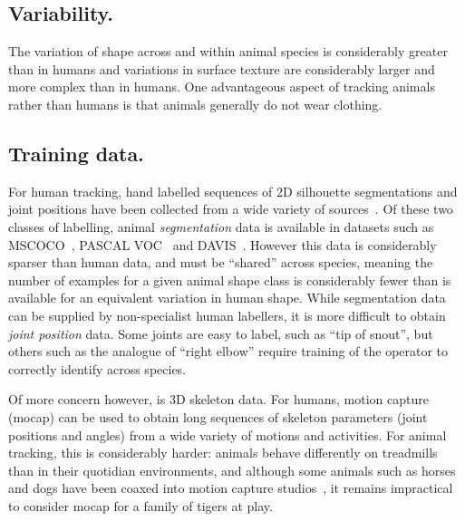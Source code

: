 \subsection{Variability.}
The variation of shape across and within animal species is considerably greater than in humans and variations in surface texture are considerably larger and more complex than in humans. One advantageous aspect of tracking animals rather than humans is that animals generally do not wear clothing. 


\subsection{Training data.}
For human tracking, hand labelled sequences of 2D silhouette segmentations and joint positions have been collected from a wide variety of sources~\cite{andriluka14cvpr,lin2014microsoft,johnson2010clustered}. Of these two classes of labelling, animal {\em segmentation} data is available in datasets such as MSCOCO~\cite{lin2014microsoft}, PASCAL VOC~\cite{everingham2010pascal} and DAVIS~\cite{Perazzi2016}.  However this data is considerably sparser than human data, and must be ``shared'' across species, meaning the number of examples for a given animal shape class is considerably fewer than is available for an equivalent variation in human shape.  While segmentation data can be supplied by non-specialist human labellers, it is more difficult to obtain {\em joint position} data.  Some joints are easy to label, such as ``tip of snout'', but others such as the analogue of ``right elbow'' require training of the operator to correctly identify across species.

Of more concern however, is 3D skeleton data.  For humans, motion capture (mocap) can be used to obtain long sequences of skeleton parameters (joint positions and angles) from a wide variety of motions and activities.
For animal tracking, this is considerably harder: animals behave differently on treadmills than in their quotidian environments, and although some animals such as horses and dogs have been coaxed into motion capture studios~\cite{wilhelm2015furyexplorer}, it remains impractical to consider mocap for a family of tigers at play.

